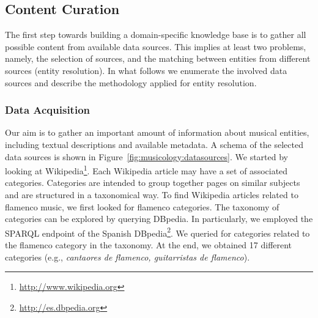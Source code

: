 \subsection{Content Curation}\label{sec:musicology:kb_curation}

The first step towards building a domain-specific knowledge base is to gather all possible content from available data sources. This implies at least two problems, namely, the selection of sources, and the matching between entities from different sources (entity resolution). In what follows we enumerate the involved data sources and describe the methodology applied for entity resolution.

\subsubsection{Data Acquisition}\label{sec:musicology:datasoruces}

Our aim is to gather an important amount of information about musical entities, including textual descriptions and available metadata. A schema of the selected data sources is shown in Figure~\ref{fig:musicology:datasources}. We started by looking at Wikipedia\footnote{\url{http://www.wikipedia.org}}.%
Each Wikipedia article may have a set of associated categories. Categories are intended to group together pages on similar subjects and are structured in a taxonomical way. To find Wikipedia articles related to flamenco music, we first looked for flamenco categories. The taxonomy of categories can be explored by querying DBpedia.%
In particularly, we employed the SPARQL endpoint of the Spanish DBpedia\footnote{\url{http://es.dbpedia.org}}. We queried for categories related to the flamenco category in the taxonomy. At the end, we obtained 17 different categories (e.g., \textit{cantaores de flamenco, guitarristas de flamenco}).


